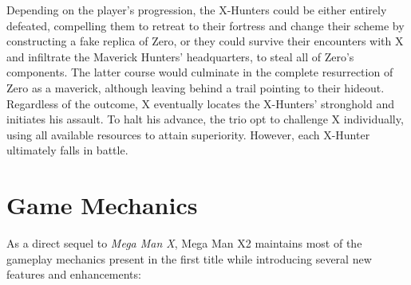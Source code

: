 Depending on the player's progression, the X-Hunters could be either entirely defeated, compelling them to retreat to their fortress and change their scheme by constructing a fake replica of Zero, or they could survive their encounters with X and infiltrate the Maverick Hunters' headquarters, to steal all of Zero's components. The latter course would culminate in the complete resurrection of Zero as a maverick, although leaving behind a trail pointing to their hideout. Regardless of the outcome, X eventually locates the X-Hunters' stronghold and initiates his assault. To halt his advance, the trio opt to challenge X individually, using all available resources to attain superiority. However, each X-Hunter ultimately falls in battle.


\section{Game Mechanics}
As a direct sequel to \emph{Mega Man X}, Mega Man X2 maintains most of the gameplay mechanics present in the first title while introducing several new features and enhancements:
